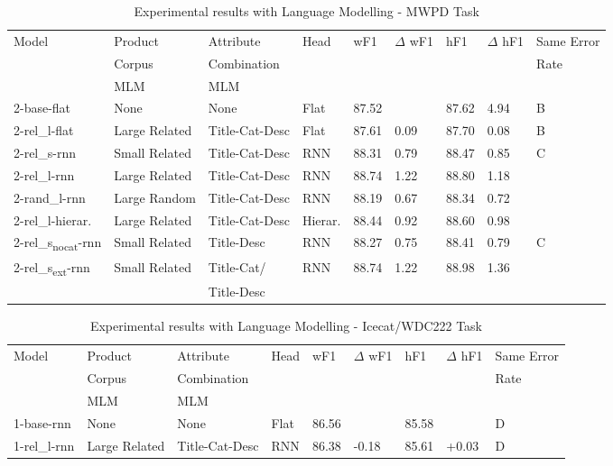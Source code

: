 \documentclass[11pt,dvipdfm]{article}
\begin{document}
\begin{table*}
  \centering
  \label{tab:MWPD2}
\begin{tabular}{@{}lllllllll@{}}
Model & Product  & Attribute & Head & wF1   & $\Delta$ wF1 & hF1   & $\Delta$ hF1 & Same Error \\ 
 & Corpus  & Combination &  &    &  &   &  & Rate \\ 
   & \ac{MLM}        & \ac{MLM}       &   &  &  &  & & \\ \hline
2-base-flat         & None & None & Flat           & 87.52 &   & 87.62 & 4.94 & B \\
2-rel\_l-flat & Large Related & Title-Cat-Desc & Flat & 87.61 & 0.09   & 87.70  & 0.08 & B  \\
2-rel\_s-rnn & Small Related & Title-Cat-Desc & RNN  & 88.31 & 0.79   & 88.47 & 0.85 & C \\
2-rel\_l-rnn & Large Related & Title-Cat-Desc & RNN & 88.74 & 1.22  & 88.80  & 1.18 &  \\
2-rand\_l-rnn & Large Random  & Title-Cat-Desc & RNN & 88.19 & 0.67  & 88.34 & 0.72 & \\
2-rel\_l-hierar. & Large Related & Title-Cat-Desc & Hierar. & 88.44 & 0.92  & 88.60 & 0.98 & \\
2-rel\_s\textsubscript{nocat}-rnn & Small Related & Title-Desc & RNN & 88.27 & 0.75   & 88.41 & 0.79 & C \\
2-rel\_s\textsubscript{ext}-rnn & Small Related & Title-Cat/ & RNN & 88.74 & 1.22  & 88.98 & 1.36 & \\
 & & Title-Desc & & & & & & \\
\end{tabular}
\caption{Experimental results with Language Modelling - MWPD Task}
\end{table*}

\begin{table*}
  \centering
  \label{tab:Icecat2}
\begin{tabular}{@{}lllllllll@{}}
\toprule
Model & Product  & Attribute & Head & wF1   & $\Delta$ wF1 & hF1   & $\Delta$ hF1 & Same Error\\ 
 & Corpus  & Combination &  &    &  &   &  & Rate\\ 
   & \ac{MLM}        & \ac{MLM}       &   &  &  &  & & \\ \hline
1-base-rnn         & None & None & Flat           & 86.56 &   & 85.58 &  & D \\
1-rel\_l-rnn & Large Related & Title-Cat-Desc & RNN & 86.38 & -0.18 & 85.61  & +0.03 & D  \\
\end{tabular}
\caption{Experimental results with Language Modelling - Icecat/WDC222 Task}
\end{table*}
\end{document}
